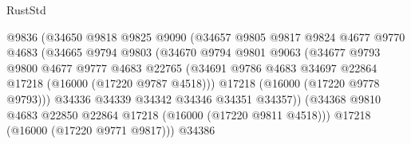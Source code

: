 \begin{lexlean}{RustStd}
\begin{coremodule}
                                    @9836
                                    (@34650
                                      @9818
                                      @9825
                                      @9090
                                      (@34657
                                        @9805
                                        @9817
                                        @9824
                                        @4677
                                        @9770
                                        @4683
                                        (@34665
                                          @9794
                                          @9803
                                          (@34670
                                            @9794
                                            @9801
                                            @9063
                                            (@34677
                                              @9793
                                              @9800
                                              @4677
                                              @9777
                                              @4683
                                              @22765
                                              (@34691
                                                @9786
                                                @4683
                                                @34697
                                                @22864
                                                @17218
                                                (@16000 (@17220 @9787 @4518)))
                                              @17218
                                              (@16000 (@17220 @9778 @9793)))
                                            @34336
                                            @34339
                                            @34342
                                            @34346
                                            @34351
                                            @34357))
                                        (@34368
                                          @9810
                                          @4683
                                          @22850
                                          @22864
                                          @17218
                                          (@16000 (@17220 @9811 @4518)))
                                        @17218
                                        (@16000 (@17220 @9771 @9817)))
                                      @34386

\end{coremodule}
\end{lexlean}
